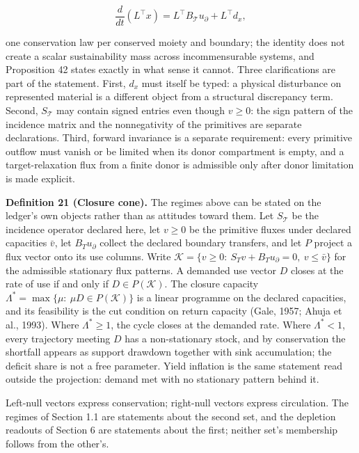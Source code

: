 \documentclass[11pt]{article}
\begin{document}
$$\frac{d}{dt}(L^\top x) = L^\top B_{\mathcal{T}} u_{\partial} + L^\top d_x,$$

 one conservation law per conserved moiety and boundary; the identity does not create a scalar sustainability mass across incommensurable systems, and Proposition 42 states exactly in what sense it cannot. Three clarifications are part of the statement. First, \(d_x\) must itself be typed: a physical disturbance on represented material is a different object from a structural discrepancy term. Second, \(S_{\mathcal{T}}\) may contain signed entries even though \(v \ge 0\): the sign pattern of the incidence matrix and the nonnegativity of the primitives are separate declarations. Third, forward invariance is a separate requirement: every primitive outflow must vanish or be limited when its donor compartment is empty, and a target-relaxation flux from a finite donor is admissible only after donor limitation is made explicit.

\textbf{Definition 21 (Closure cone).} The regimes above can be stated on the ledger's own objects rather than as attitudes toward them. Let \(S_{\mathcal{T}}\) be the incidence operator declared here, let \(v\ge0\) be the primitive fluxes under declared capacities \(\bar v\), let \(B_Tu_\partial\) collect the declared boundary transfers, and let \(P\) project a flux vector onto its use columns. Write \(\mathcal K=\allowbreak{}\{v\ge0:\ S_Tv+\allowbreak{}B_Tu_\partial=\allowbreak{}0,\allowbreak{}\ v\le\bar v\}\) for the admissible stationary flux patterns. A demanded use vector \(D\) closes at the rate of use if and only if \(D\in P(\mathcal K)\). The closure capacity \(\Lambda^{*}=\allowbreak{}\max\{\mu:\ \mu D\in P(\mathcal K)\}\) is a linear programme on the declared capacities, and its feasibility is the cut condition on return capacity (Gale, 1957; Ahuja et al., 1993). Where \(\Lambda^{*}\ge1\), the cycle closes at the demanded rate. Where \(\Lambda^{*}<1\), every trajectory meeting \(D\) has a non-stationary stock, and by conservation the shortfall appears as support drawdown together with sink accumulation; the deficit share is not a free parameter. Yield inflation is the same statement read outside the projection: demand met with no stationary pattern behind it.

Left-null vectors express conservation; right-null vectors express circulation. The regimes of Section 1.1 are statements about the second set, and the depletion readouts of Section 6 are statements about the first; neither set's membership follows from the other's.
\end{document}
